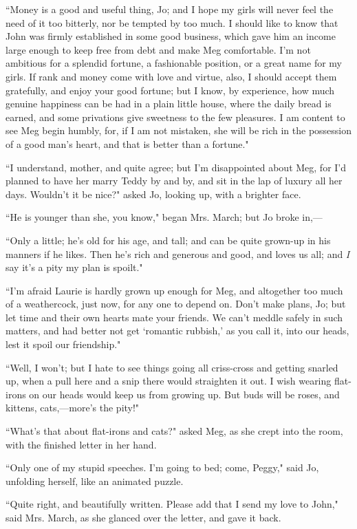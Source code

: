 ``Money is a good and useful thing, Jo; and I hope my girls will never
feel the need of it too bitterly, nor be tempted by too much. I should
like to know that John was firmly established in some good business,
which gave him an income large enough to keep free from debt and make
Meg comfortable. I'm not ambitious for a splendid
fortune, a fashionable position, or a great name for my girls. If rank
and money come with love and virtue, also, I should accept them
gratefully, and enjoy your good fortune; but I know, by experience, how
much genuine happiness can be had in a plain little house, where the
daily bread is earned, and some privations give sweetness to the few
pleasures. I am content to see Meg begin humbly, for, if I am not
mistaken, she will be rich in the possession of a good
man's heart, and that is better than a fortune."

``I understand, mother, and quite agree; but I'm
disappointed about Meg, for I'd planned to have her
marry Teddy by and by, and sit in the lap of luxury all her days.
Wouldn't it be nice?" asked Jo, looking up, with a
brighter face.

``He is younger than she, you know," began Mrs. March; but Jo broke
in,---

``Only a little; he's old for his age, and tall; and can
be quite grown-up in his manners if he likes. Then he's
rich and generous and good, and loves us all; and \emph{I} say
it's a pity my plan is spoilt."

``I'm afraid Laurie is hardly grown up enough for Meg,
and altogether too much of a weathercock, just now, for any one to
depend on. Don't make plans, Jo; but let time and their
own hearts mate your friends. We can't meddle safely in
such matters, and had better not get `romantic
rubbish,' as you call it, into our heads, lest it spoil
our friendship."

``Well, I won't; but I hate to see things going all
criss-cross and getting snarled up, when a pull here and a snip there
would straighten it out. I wish wearing flat-irons on our heads would
keep us from growing up. But buds will be roses, and kittens,
cats,---more's the pity!"

``What's that about flat-irons and cats?" asked Meg, as
she crept into the room, with the finished letter in her hand.

``Only one of my stupid speeches. I'm going to bed; come,
Peggy," said Jo, unfolding herself, like an animated puzzle.

``Quite right, and beautifully written. Please add that I send my love to
John," said Mrs. March, as she glanced over the letter, and gave it
back.


